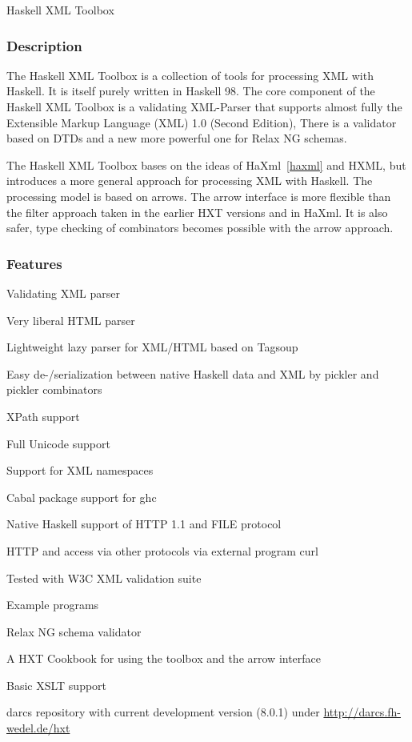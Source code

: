 \begin{hcarentry}{Haskell XML Toolbox}
\label{hxt}
\makeheader

\subsubsection*{Description}

The Haskell XML Toolbox is a collection of tools for processing XML with
Haskell. It is itself purely written in Haskell 98. The core component of the
Haskell XML Toolbox is a validating XML-Parser that supports
almost fully the Extensible Markup Language (XML) 1.0 (Second Edition),
There is a validator based on DTDs and a new more powerful one for
Relax NG schemas.

The Haskell XML Toolbox bases on the ideas of HaXml~\cref{haxml} and HXML,
but introduces a more general approach for processing XML with Haskell.
The processing model is based on arrows. The arrow interface is more flexible
than the filter approach taken in the earlier HXT versions and in HaXml.
It is also safer, type checking of combinators becomes possible with the arrow
approach.

\subsubsection*{Features}

\begin{compactitem}
\item Validating XML parser
\item Very liberal HTML parser
\item Lightweight lazy parser for XML/HTML based on Tagsoup
\item Easy de-/serialization between native Haskell data and XML by pickler and pickler combinators
\item XPath support
\item Full Unicode support
\item Support for XML namespaces
\item Cabal package support for ghc
\item Native Haskell support of HTTP 1.1 and FILE protocol
\item HTTP and access via other protocols via external program curl
\item Tested with W3C XML validation suite
\item Example programs
\item Relax NG schema validator
\item A HXT Cookbook for using the toolbox and the arrow interface
\item Basic XSLT support
\item darcs repository with current development version (8.0.1) under
  \url{http://darcs.fh-wedel.de/hxt}
\end{compactitem}


\end{hcarentry}
